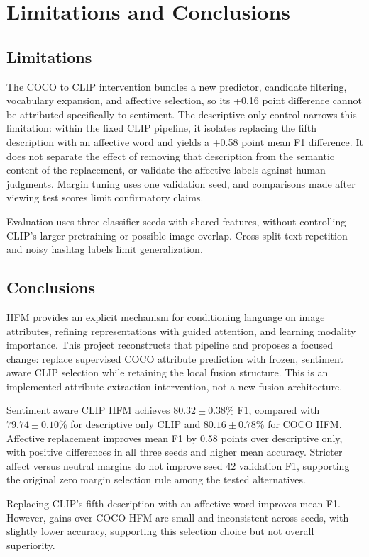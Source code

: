 \documentclass[conference]{IEEEtran}
\begin{document}
\section{Limitations and Conclusions}
\subsection{Limitations}
The COCO to CLIP intervention bundles a new predictor, candidate filtering, vocabulary expansion, and affective selection, so its +0.16 point difference cannot be attributed specifically to sentiment. The descriptive only control narrows this limitation: within the fixed CLIP pipeline, it isolates replacing the fifth description with an affective word and yields a +0.58 point mean F1 difference. It does not separate the effect of removing that description from the semantic content of the replacement, or validate the affective labels against human judgments. Margin tuning uses one validation seed, and comparisons made after viewing test scores limit confirmatory claims.

Evaluation uses three classifier seeds with shared features, without controlling CLIP's larger pretraining or possible image overlap. Cross-split text repetition and noisy hashtag labels limit generalization.

\subsection{Conclusions}
HFM provides an explicit mechanism for conditioning language on image attributes, refining representations with guided attention, and learning modality importance. This project reconstructs that pipeline and proposes a focused change: replace supervised COCO attribute prediction with frozen, sentiment aware CLIP selection while retaining the local fusion structure. This is an implemented attribute extraction intervention, not a new fusion architecture.

Sentiment aware CLIP HFM achieves $80.32\pm0.38$\% F1, compared with $79.74\pm0.10$\% for descriptive only CLIP and $80.16\pm0.78$\% for COCO HFM. Affective replacement improves mean F1 by 0.58 points over descriptive only, with positive differences in all three seeds and higher mean accuracy. Stricter affect versus neutral margins do not improve seed 42 validation F1, supporting the original zero margin selection rule among the tested alternatives.

Replacing CLIP's fifth description with an affective word improves mean F1. However, gains over COCO HFM are small and inconsistent across seeds, with slightly lower accuracy, supporting this selection choice but not overall superiority.
\end{document}

